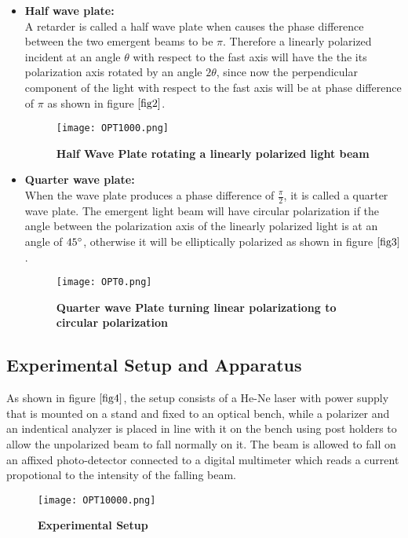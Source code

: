 		\begin{itemize}
			\item \textbf{Half wave plate:}\\
			A retarder is called a half wave plate when causes the phase difference between the two emergent beams to be $\pi$. Therefore a linearly polarized incident at an angle $\theta$ with respect to the fast axis will have the the its polarization axis rotated by an angle $2\theta$, since now the perpendicular component of the light with respect to the fast axis will be at phase difference of $\pi$ as shown in figure  $\ref{fig2}$.
			\begin{figure}[H]
				\texttt{[image: OPT1000.png]}
				\caption{\textbf{Half Wave Plate rotating a linearly polarized light beam}}
				\label{fig2}
			\end{figure} 

			\item \textbf{Quarter wave plate:}\\
			When the wave plate produces a phase difference of $\frac{\pi}{2}$, it is called a quarter wave plate. The emergent light beam will have circular polarization if the angle between the polarization axis of the linearly polarized light is at an angle of $45\degree$, otherwise it will be elliptically polarized as shown in figure $\ref{fig3}$.
			\begin{figure}[H]
				\texttt{[image: OPT0.png]}
				\caption{\textbf{Quarter wave Plate turning linear polarizationg to circular polarization}}
				\label{fig3}
			\end{figure}
		\end{itemize}

	\subsection{Experimental Setup and Apparatus}
		As shown in figure $\ref{fig4}$, the setup consists of a He-Ne laser with power supply that is mounted on a stand and fixed to an optical bench, while a polarizer and an indentical analyzer is placed in line with it on the bench using post holders to allow the unpolarized beam to fall normally on it. The beam is allowed to fall on an affixed photo-detector connected to a digital multimeter which reads a current propotional to the intensity of the falling beam.

		\begin{figure}[H]
			\texttt{[image: OPT10000.png]}
			\caption{\textbf{Experimental Setup}}
			\label{fig4}
		\end{figure}
	
